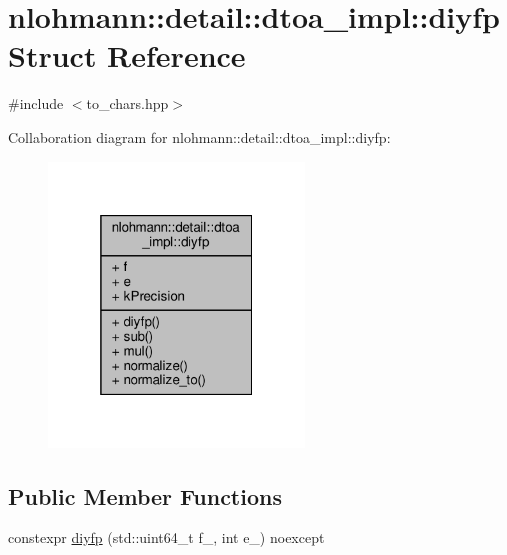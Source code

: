 \hypertarget{structnlohmann_1_1detail_1_1dtoa__impl_1_1diyfp}{}\section{nlohmann\+:\+:detail\+:\+:dtoa\+\_\+impl\+:\+:diyfp Struct Reference}
\label{structnlohmann_1_1detail_1_1dtoa__impl_1_1diyfp}


{\ttfamily \#include $<$to\+\_\+chars.\+hpp$>$}



Collaboration diagram for nlohmann\+:\+:detail\+:\+:dtoa\+\_\+impl\+:\+:diyfp\+:\nopagebreak
\begin{figure}[H]
\begin{center}
\leavevmode
\includegraphics[width=193pt]{structnlohmann_1_1detail_1_1dtoa__impl_1_1diyfp__coll__graph}
\end{center}
\end{figure}
\subsection*{Public Member Functions}
\begin{DoxyCompactItemize}
\item 
constexpr \hyperlink{structnlohmann_1_1detail_1_1dtoa__impl_1_1diyfp_ad8798a8823a49c8412f0fada9892c918}{diyfp} (std\+::uint64\+\_\+t f\+\_\+, int e\+\_\+) noexcept
\end{DoxyCompactItemize}
